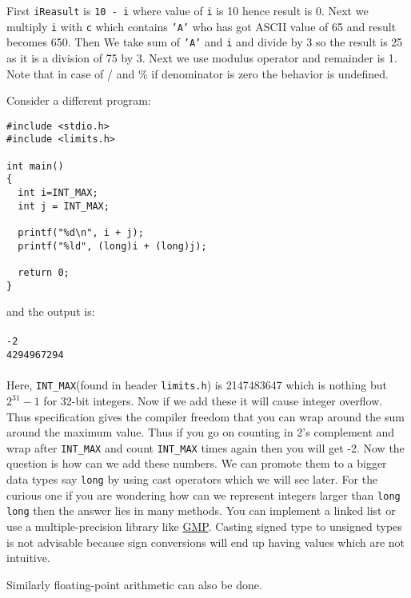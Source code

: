 First \texttt{iReasult} is \texttt{10 - i} where value of \texttt{i} is 10
hence result is 0. Next we multiply \texttt{i} with \texttt{c} which
contains \texttt{'A'} who has got ASCII value of 65 and result becomes
650. Then We take sum of \texttt{'A'} and  \texttt{i} and divide by 3 so the
result is 25 as it is a division of 75 by 3. Next we use modulus operator and
remainder is 1. Note that in case of / and \% if denominator is zero the
behavior is undefined.

Consider a different program:

\begin{Verbatim}[frame=single]
#include <stdio.h>
#include <limits.h>

int main()
{
  int i=INT_MAX;
  int j = INT_MAX;

  printf("%d\n", i + j);
  printf("%ld", (long)i + (long)j);

  return 0;
}
\end{Verbatim}

and the output is:
\\\\\texttt{-2\\
4294967294\\\\}
Here, \texttt{INT\_MAX}(found in header \texttt{limits.h}) is 2147483647 which 
is nothing but $2^{31} - 1$ for
32-bit integers. Now if we add these it will cause integer overflow. Thus
specification gives the compiler freedom that you can wrap around the sum
around the maximum value. Thus if you go on counting in 2's complement and wrap
after \texttt{INT\_MAX} and count \texttt{INT\_MAX} times again then you will
get -2. Now the question is how can we add these numbers. We can promote them
to a bigger data types say \texttt{long} by using cast operators which we will
see later. For the curious one if you are wondering how can we represent 
integers larger than \texttt{long long} then the answer lies in many methods. 
You can implement a linked list or use  a multiple-precision library like 
\href{https://gmplib.org/}{GMP}. Casting signed type to unsigned types is not 
advisable because sign conversions will end up having values which are not 
intuitive.

Similarly floating-point arithmetic can also be done.

